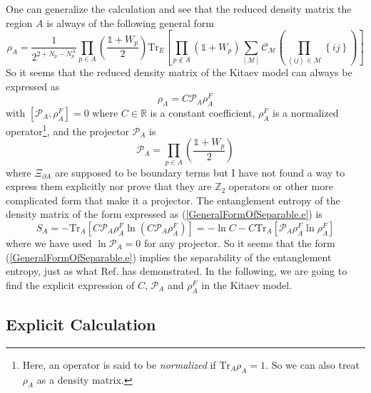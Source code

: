 \documentclass[12font]{article}
\theoremstyle{definition}
\numberwithin{equation}{section}
\newcommand{\anglelr}[1]{\left\langle #1 \right\rangle}
\newcommand{\lr}[1]{\left(  #1  \right)}
\newcommand{\lrm}[1]{\left[  #1  \right]}
\newcommand{\lrg}[1]{\left\{  #1  \right\}}
\newcommand{\de}{\partial}
\newcommand{\mrm}[1]{\mathrm{#1}}
\newcommand{\alert}[1]{{\color{red}#1}}
\newcommand{\Tr}{\mrm{Tr}}
\begin{document}
One can generalize the calculation and see that the reduced density matrix the region $A$ is always of the following general form
\begin{equation}\label{ReducedDM_general.e}
\rho_A = \frac{1}{2^{2+N_p-N^A_p}}\prod_{p\in A}\lr{\frac{\mathds{1} + W_p}{2}}\Tr_E\lrm{\prod_{p\notin A}\lr{\mathds{1} + W_p}\sum_{[\mathcal{M}]}\mathcal{C}_{\mathcal{M}}\lr{\prod_{\anglelr{ij} \in \mathcal{M}}\lrg{ij}}}
\end{equation}
So it seems that the reduced density matrix of the Kitaev model can always be expressed as
\begin{equation}\label{GeneralFormOfSeparable.e}
\rho_A = C\mathcal{P}_A\rho_A^F
\end{equation}
with $[\mathcal{P}_A, \rho_A^F]=0$ where $C\in \mathbb{R}$ is a constant coefficient, $\rho_A^F$ is a normalized operator\footnote{Here, an operator is said to be \emph{normalized} if $\Tr_A\rho_A = 1$. So we can also treat $\rho_A$ as a density matrix.}, and the projector $\mathcal{P}_A$ is 
\[
\mathcal{P}_A = \prod_{p\in A}\lr{\frac{\mathds{1}+W_p}{2}}
\]
where $\Xi_{\de A}$ are supposed to be boundary terms but \alert{I have not found a way to} express them explicitly nor prove that they are $\mathbb{Z}_2$ operators or other more complicated form that make it a projector. The entanglement entropy of the density matrix of the form expressed as (\ref{GeneralFormOfSeparable.e}) is
\begin{equation}\label{GeneralFormProjectorEE.e}
  S_A = -\Tr_A\lrm{C\mathcal{P}_A\rho_A^F \ln\lr{C\mathcal{P}_A\rho_A^F}} 
  = -\ln C - C\Tr_A\lrm{\mathcal{P}_A\rho_A^F\ln\rho_A^F}
\end{equation}
where we have used $\ln\mathcal{P}_A = 0$ for any projector. So it seems that the form (\ref{GeneralFormOfSeparable.e}) implies the separability of the entanglement entropy, just as what Ref.\cite{Qi} has demonstrated. In the following, we are going to find the explicit expression of $C$, $\mathcal{P}_A$ and $\rho_A^F$ in the Kitaev model. 

\subsection{Explicit Calculation}
\end{document}
